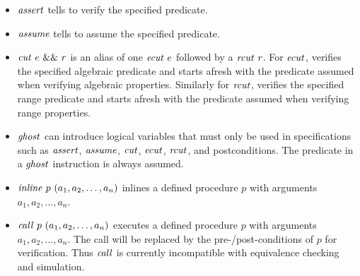 \documentclass{article}
\begin{document}
\begin{itemize}
\item $\mathit{assert}$ tells \cryptoline to verify the specified predicate.
\item $\mathit{assume}$ tells \cryptoline to assume the specified predicate.
\item $\mathit{cut}\ e\ \&\&\ r$ is an alias of one $\mathit{ecut}\ e$ followed by
  a $\mathit{rcut}\ r$.
  For $\mathit{ecut}$, \cryptoline verifies the specified algebraic predicate
  and starts afresh with the predicate assumed when verifying algebraic
  properties.
  Similarly for $\mathit{rcut}$, \cryptoline verifies the specified range
  predicate and starts afresh with the predicate assumed when verifying
  range properties.
\item $\mathit{ghost}$ can introduce logical variables that must only be used
  in specifications such as $\mathit{assert}$, $\mathit{assume}$, $\mathit{cut}$, $\mathit{ecut}$,
  $\mathit{rcut}$, and postconditions.
  The predicate in a $\mathit{ghost}$ instruction is always assumed.
\item $\mathit{inline}\ p\ (a_1, a_2, \ldots, a_n)$ inlines a defined
  procedure $p$ with arguments $a_1, a_2, \ldots, a_n$.
\item $\mathit{call}\ p\ (a_1, a_2, \ldots, a_n)$ executes a defined
  procedure $p$ with arguments $a_1, a_2, \ldots, a_n$.
  The call will be replaced by the pre-/post-conditions of $p$ for
  verification.
  Thus $\mathit{call}$ is currently incompatible with equivalence checking
  and simulation.
\end{itemize}
\end{document}
